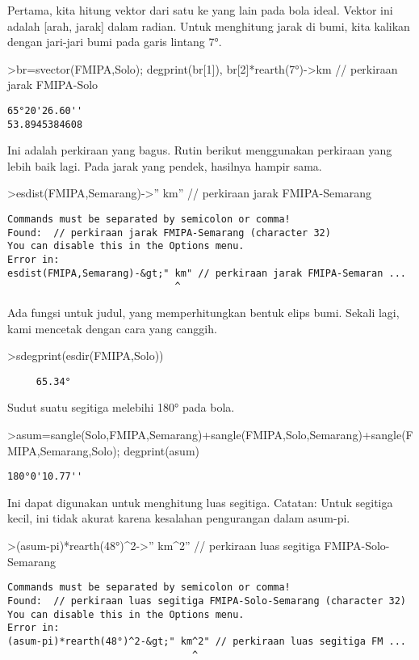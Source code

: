 \documentclass[
]{book}
\begin{document}
Pertama, kita hitung vektor dari satu ke yang lain pada bola ideal. Vektor ini adalah {[}arah, jarak{]} dalam radian. Untuk menghitung jarak di bumi, kita kalikan dengan jari-jari bumi pada garis lintang 7°.

\textgreater br=svector(FMIPA,Solo); degprint(br{[}1{]}), br{[}2{]}*rearth(7°)-\textgreater km // perkiraan jarak FMIPA-Solo

\begin{verbatim}
65°20'26.60''
53.8945384608
\end{verbatim}

Ini adalah perkiraan yang bagus. Rutin berikut menggunakan perkiraan yang lebih baik lagi. Pada jarak yang pendek, hasilnya hampir sama.

\textgreater esdist(FMIPA,Semarang)-\textgreater'' km'' // perkiraan jarak FMIPA-Semarang

\begin{verbatim}
Commands must be separated by semicolon or comma!
Found:  // perkiraan jarak FMIPA-Semarang (character 32)
You can disable this in the Options menu.
Error in:
esdist(FMIPA,Semarang)-&gt;" km" // perkiraan jarak FMIPA-Semaran ...
                             ^
\end{verbatim}

Ada fungsi untuk judul, yang memperhitungkan bentuk elips bumi. Sekali lagi, kami mencetak dengan cara yang canggih.

\textgreater sdegprint(esdir(FMIPA,Solo))

\begin{verbatim}
     65.34°
\end{verbatim}

Sudut suatu segitiga melebihi 180° pada bola.

\textgreater asum=sangle(Solo,FMIPA,Semarang)+sangle(FMIPA,Solo,Semarang)+sangle(FMIPA,Semarang,Solo); degprint(asum)

\begin{verbatim}
180°0'10.77''
\end{verbatim}

Ini dapat digunakan untuk menghitung luas segitiga. Catatan: Untuk segitiga kecil, ini tidak akurat karena kesalahan pengurangan dalam asum-pi.

\textgreater(asum-pi)*rearth(48°)\^{}2-\textgreater'' km\^{}2'' // perkiraan luas segitiga FMIPA-Solo-Semarang

\begin{verbatim}
Commands must be separated by semicolon or comma!
Found:  // perkiraan luas segitiga FMIPA-Solo-Semarang (character 32)
You can disable this in the Options menu.
Error in:
(asum-pi)*rearth(48°)^2-&gt;" km^2" // perkiraan luas segitiga FM ...
                                ^
\end{verbatim}
\end{document}

